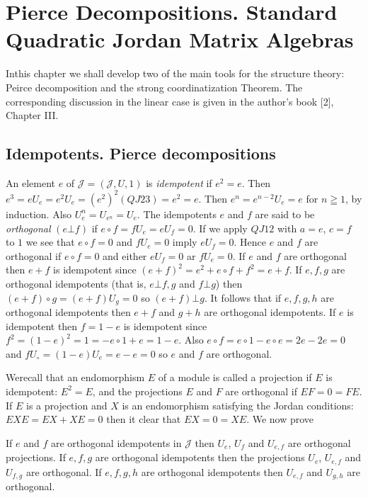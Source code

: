 \chapter[Pierce Decompositions. Standard Quadratic...]{Pierce
  Decompositions. Standard Quadratic Jordan Matrix 
  Algebras}\label{c2}

In\pageoriginale this chapter we shall develop two of the main tools for the
structure theory: Peirce decomposition and the strong coordinatization
Theorem. The corresponding discussion in the linear case is given in
the author's book [2], Chapter III.

\section{Idempotents. Pierce decompositions}\label{c2:sec1}

An element $e$ of $\mathscr{J}=(\mathscr{J},U,1)$ is {\em idempotent}
if $e^{2}=e$. Then $e^{3}=eU_e=e^{2}U_e =(e^{2})^{2}(QJ
23)=e^{2}=e$. Then $e^{n}=e^{n-2}U_e=e$ for $n\geqq 1$, by
induction. Also $U^{n}_e=U_{e^{n}}=U_e$. The idempotents $e$ and $f$
are said to be {\em orthogonal} $(e\bot f)$ if $e\circ
f=fU_e=eU_f=0$. If we apply $QJ12$ with $a=e$, $c=f$ to $1$ we see
that $e\circ f=0$ and $fU_e=0$ imply $eU_f=0$. Hence $e$ and $f$ are
orthogonal if $e\circ f=0$ and either $eU_f=0$ ar $fU_e=0$. If $e$ and
$f$ are orthogonal then $e+f$ is idempotent since
$(e+f)^{2}=e^{2}+e\circ f+f^{2}=e+f$. If $e,f,g$ are orthogonal
idempotents (that is, $e\bot f,g$ and $f\bot g$) then $(e+f)\circ
g=(e+f)U_g=0$ so $(e+f)\bot g$. It follows that if $e,f,g,h$ are
orthogonal idempotents then $e+f$ and $g+h$ are orthogonal
idempotents. If $e$ is idempotent then $f=1-e$ is idempotent since
$f^{2}=(1-e)^{2}=1=-e\circ 1+e=1-e$. Also $e\circ f=e\circ 1-e\circ
e=2e-2e=0$ and $fU_{\circ}=(1-e)U_e=e-e=0$ so $e$ and $f$ are
orthogonal.

We\pageoriginale recall that an endomorphism $E$ of a module is called
a projection if $E$ is idempotent: $E^{2}=E$, and the projections $E$
and $F$ are orthogonal if $EF=0=FE$. If $E$ is a projection and $X$ is
an endomorphism satisfying the Jordan conditions: $EXE=EX+XE=0$ then
it clear that $EX=0=XE$. We now prove

\begin{lemma}\label{c2:lem1}
  If $e$ and $f$ are orthogonal idempotents in $\mathscr{J}$ then $U_e$,
  $U_f$ and $U_{e,f}$ are orthogonal projections. If $e,f,g$ are
  orthogonal idempotents then the projections $U_e$, $U_{e,f}$ and
  $U_{f,g}$ are orthogonal. If $e,f,g,h$ are orthogonal idempotents then
  $U_{e,f}$ and $U_{g,h}$ are orthogonal.
\end{lemma}

